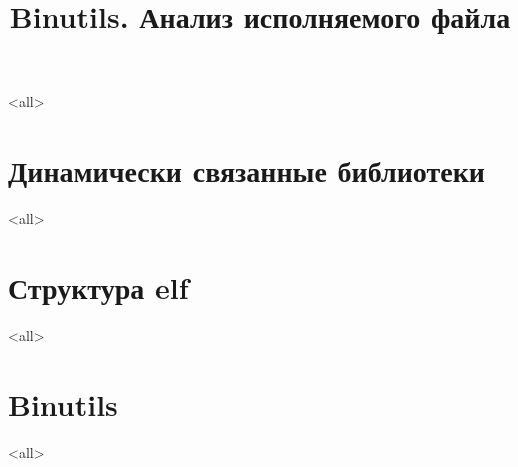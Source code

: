 

\title[binutils]{Binutils. Анализ исполняемого файла}





\begin{frame}
	\frametitle{}
	\titlepage
	\vspace{-0.5cm}
	\begin{center}
	\end{center}
\end{frame}

\begin{frame}
	\tableofcontents
\end{frame}



\mode<all>{}

\section{Динамически связанные библиотеки}
\mode<all>{}

\section{Структура elf}
\mode<all>{}

\section{Binutils}
\mode<all>{}


